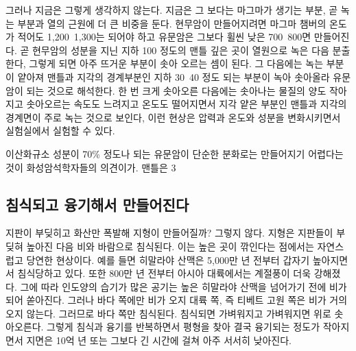 \documentclass[12pt, a4paper, oneside]{book}
\begin{document}
그러나 지금은 그렇게 생각하지 않는다. 지금은 그 보다는 마그마가 생기는 부분, 곧 녹는 부분과 열의 근원에 더 큰 비중을 둔다. 현무암이 만들어지려면 마그마 챔버의 온도가 적어도 1,200~1,300는 되어야 하고 유문암은 그보다 휠씬 낮은 700~800면 만들어진다. 곧 현무암의 성분을 지닌 지하 100 정도의 맨틀 깊은 곳이 열원으로 녹은 다음 분출한다, 그렇게 되면 아주 뜨거운 부분이 솟아 오르는 셈이 된다. 그 다음에는 녹는 부분이 얕아져 맨틀과 지각의 경계부분인 지하 30~40 정도 되는 부분이 녹아 솟아올라 유문암이 되는 것으로 해석한다. 한 번 크게 솟아오른 다음에는 솟아나는 물질의 양도 작아지고 솟아오르는 속도도 느려지고 온도도 떨어지면서 지각 얕은 부분인 맨틀과 지각의 경계면이 주로 녹는 것으로 보인다, 이런 현상은 압력과 온도와 성분을 변화시키면서 실험실에서 실험할 수 있다.

이산화규소 성분이 70\% 정도나 되는 유문암이  단순한 분화로는 만들어지기 어렵다는 것이 화성암석학자들의 의견이가. 맨틀은 3%




\subsection{침식되고 융기해서 만들어진다}

지판이 부딪히고 화산만 폭발해 지형이 만들어질까? 그렇지 않다.
지형은 지판들이 부딪혀 높아진 다음 비와 바람으로 침식된다. 이는 높은 곳이 깎인다는 점에서는 자연스럽고 당연한 현상이다. 예를 들면 히말라야 산맥은 5,000만 년 전부터 갑자기 높아지면서 침식당하고 있다. 또한 800만 년 전부터 아시아 대륙에서는 계절풍이 더욱 강해졌다. 그에 따라 인도양의 습기가 많은 공기는 높은 히말라야 산맥을 넘어가기 전에 비가 되어 쏟아진다. 그러나 바다 쪽에만 비가 오지 대륙 쪽, 즉 티베트 고원 쪽은 비가 거의 오지 않는다. 그러므로 바다 쪽만 침식된다. 침식되면 가벼워지고 가벼워지면 위로 솟아오른다. 그렇게 침식과 융기를 반복하면서 평형을 찾아 결국 융기되는 정도가 작아지면서 지면은 10억 년 또는 그보다 긴 시간에 걸쳐 아주 서서히 낮아진다.





\end{document}

